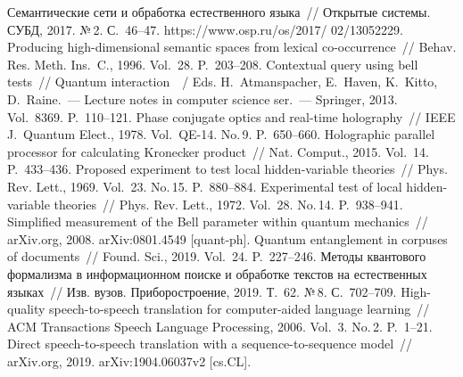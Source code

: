 \begin{multicols}{2}
{\small\frenchspacing
 {%
 \begin{thebibliography}{99}
 Семантические сети и обработка естественного языка~// Открытые системы. 
СУБД, 2017. №\,2. С.~46--47. {\sf https://www.osp.ru/os/2017/ 02/13052229}.
 Producing high-dimensional semantic spaces from lexical  
co-occurrence~// Behav. Res. Meth. Ins.~C., 1996. Vol.~28.  
P.~203--208.
 Contextual query using bell tests~//  
Quantum interaction~~/
Eds. H.~Atmanspacher, E.~Haven, K.~Kitto, D.~Raine.~--- Lecture notes in computer 
science ser.~--- Springer, 2013. Vol.~8369. P.~110--121.
 Phase conjugate optics and real-time holography~// IEEE J.~Quantum Elect., 
1978. Vol.~QE-14. No.\,9. P.~650--660.
 Holographic parallel processor for calculating Kronecker 
product~// Nat. Comput., 2015. Vol.~14. P.~433--436.
 Proposed experiment to test local 
hidden-variable theories~// Phys. Rev. Lett., 1969. Vol.~23. No.\,15. P.~880--884.
 Experimental test of local hidden-variable theories~// Phys. 
Rev. Lett., 1972. Vol.~28. No.\,14. P.~938--941.
 Simplified measurement of the Bell parameter 
within quantum mechanics~// arXiv.org, 2008. arXiv:0801.4549 [quant-ph].
 Quantum entanglement in corpuses of documents~// Found. 
Sci., 2019. Vol.~24. P.~227--246.
 Методы квантового формализма в информационном поиске и обработке 
текстов на естественных языках~// Изв. вузов. Приборостроение, 2019. Т.~62. №\,8.  
С.~702--709.
 High-quality speech-to-speech translation for computer-aided language 
learning~// ACM Transactions Speech Language Processing, 2006. Vol.~3. No.\,2. P.~1--21.
Direct speech-to-speech translation with a sequence-to-sequence model~// arXiv.org, 2019. 
arXiv:\linebreak 1904.06037v2 [cs.CL].
\end{thebibliography}

 }
 }

\end{multicols}

